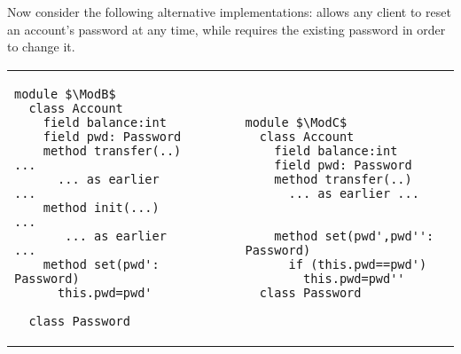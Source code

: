  

Now consider the following alternative implementations:
\ModB allows any client to reset an account's password at any time, while
\ModC requires the existing password in order to change it.


  
%
  
  

\begin{tabular}{lll}
\begin{minipage}[b]{0.42\textwidth}
\begin{lstlisting}[mathescape=true, language=chainmail, frame=lines]
module $\ModB$
  class Account
    field balance:int 
    field pwd: Password 
    method transfer(..) ...
      ... as earlier ...
    method init(...) ...
       ... as earlier ...
    method set(pwd': Password)
      this.pwd=pwd'
      
  class Password
\end{lstlisting}
\end{minipage}
&\ \ \  \ \   &%
\begin{minipage}[b]{0.45\textwidth}
\begin{lstlisting}[mathescape=true, language=chainmail, frame=lines]
module $\ModC$
  class Account
    field balance:int 
    field pwd: Password 
    method transfer(..) 
      ... as earlier ...
    
    
    method set(pwd',pwd'': Password)
      if (this.pwd==pwd') 
        this.pwd=pwd''
  class Password
\end{lstlisting}
\end{minipage} 
\end{tabular}

